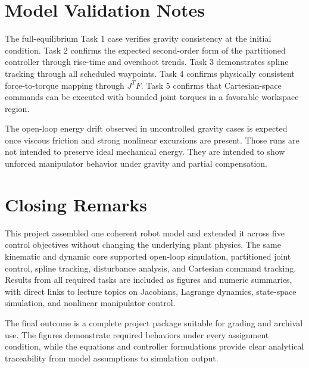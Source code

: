 \documentclass[11pt]{article}
\begin{document}
\section{Model Validation Notes}
The full-equilibrium Task 1 case verifies gravity consistency at the initial condition. Task 2 confirms the expected second-order form of the partitioned controller through rise-time and overshoot trends. Task 3 demonstrates spline tracking through all scheduled waypoints. Task 4 confirms physically consistent force-to-torque mapping through $J^TF$. Task 5 confirms that Cartesian-space commands can be executed with bounded joint torques in a favorable workspace region.

The open-loop energy drift observed in uncontrolled gravity cases is expected once viscous friction and strong nonlinear excursions are present. Those runs are not intended to preserve ideal mechanical energy. They are intended to show unforced manipulator behavior under gravity and partial compensation.

\section{Closing Remarks}
This project assembled one coherent robot model and extended it across five control objectives without changing the underlying plant physics. The same kinematic and dynamic core supported open-loop simulation, partitioned joint control, spline tracking, disturbance analysis, and Cartesian command tracking. Results from all required tasks are included as figures and numeric summaries, with direct links to lecture topics on Jacobians, Lagrange dynamics, state-space simulation, and nonlinear manipulator control.

The final outcome is a complete project package suitable for grading and archival use. The figures demonstrate required behaviors under every assignment condition, while the equations and controller formulations provide clear analytical traceability from model assumptions to simulation output.
\end{document}
